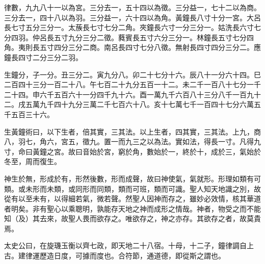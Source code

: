 律數，九九八十一以為宮。三分去一，五十四以為徵。三分益一，七十二以為商。三分去一，四十八以為羽。三分益一，六十四以為角。黃鐘長八寸十分一宮。大呂長七寸五分三分一。太蔟長七寸七分二角。夾鐘長六寸一分三分一。姑洗長六寸七分四羽。仲呂長五寸九分三分二徵。蕤賓長五寸六分三分一。林鐘長五寸七分四角。夷則長五寸四分三分二商。南呂長四寸七分八徵。無射長四寸四分三分二。應鐘長四寸二分三分二羽。

生鐘分，子一分。丑三分二。寅九分八。卯二十七分十六。辰八十一分六十四。巳二百四十三分一百二十八。午七百二十九分五百一十二。未二千一百八十七分一千二十四。申六千五百六十一分四千九十六。酉一萬九千六百八十三分八千一百九十二。戌五萬九千四十九分三萬二千七百六十八。亥十七萬七千一百四十七分六萬五千五百三十六。

生黃鐘術曰，以下生者，倍其實，三其法。以上生者，四其實，三其法。上九，商八，羽七，角六，宮五，徵九。置一而九三之以為法。實如法，得長一寸。凡得九寸，命曰黃鐘之宮。故曰音始於宮，窮於角，數始於一，終於十，成於三，氣始於冬至，周而復生。

神生於無，形成於有，形然後數，形而成聲，故曰神使氣，氣就形。形理如類有可類。或未形而未類，或同形而同類，類而可班，類而可識。聖人知天地識之別，故從有以至未有，以得細若氣，微若聲。然聖人因神而存之，雖妙必效情，核其華道者明矣。非有聖心以乘聰明，孰能存天地之神而成形之情哉。神者，物受之而不能知（及）其去來，故聖人畏而欲存之。唯欲存之，神之亦存。其欲存之者，故莫貴焉。

太史公曰，在旋璣玉衡以齊七政，即天地二十八宿。十母，十二子，鐘律調自上古。建律運歷造日度，可據而度也。合符節，通道德，即從斯之謂也。